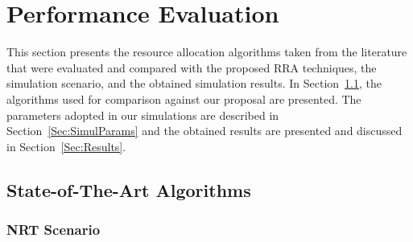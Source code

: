 \documentclass[12pt]{article}
\newcommand{\FigRef}[1]{Figure~\ref{#1}}
\newcommand{\SecRef}[1]{Section~\ref{#1}}
\begin{document}
%
\section{Performance Evaluation}
\label{sec:Performance}

This section presents the resource allocation algorithms taken from the literature that were evaluated and compared with the proposed \ac{RRA} techniques, the simulation scenario, and the obtained simulation results. In \SecRef{Sec:stateOfTheArtAlg}, the algorithms used for comparison against our proposal are presented. The parameters adopted in our simulations are described in \SecRef{Sec:SimulParams} and the obtained results are presented and discussed in \SecRef{Sec:Results}.

\subsection{State-of-The-Art Algorithms}
\label{Sec:stateOfTheArtAlg}

\subsubsection{NRT Scenario}
\label{PerfNRT}
\end{document}
